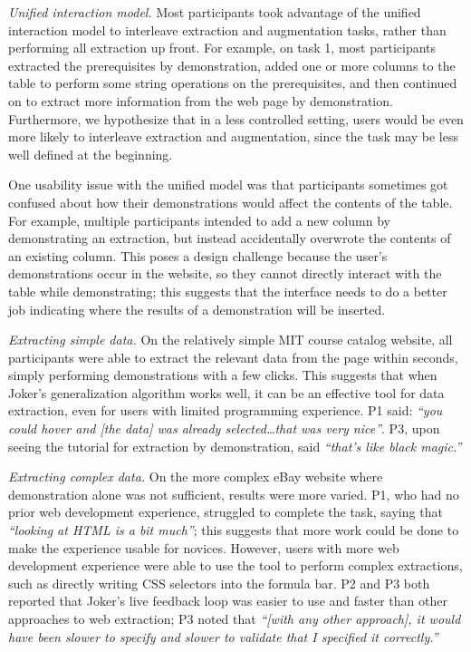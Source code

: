 \documentclass[conference]{IEEEtran}
\begin{document}
\emph{Unified interaction model.} Most participants took advantage of
the unified interaction model to interleave extraction and augmentation
tasks, rather than performing all extraction up front. For example, on
task 1, most participants extracted the prerequisites by demonstration,
added one or more columns to the table to perform some string operations
on the prerequisites, and then continued on to extract more information
from the web page by demonstration. Furthermore, we hypothesize that in
a less controlled setting, users would be even more likely to interleave
extraction and augmentation, since the task may be less well defined at
the beginning.

One usability issue with the unified model was that participants
sometimes got confused about how their demonstrations would affect the
contents of the table. For example, multiple participants intended to
add a new column by demonstrating an extraction, but instead
accidentally overwrote the contents of an existing column. This poses a
design challenge because the user's demonstrations occur in the website,
so they cannot directly interact with the table while demonstrating;
this suggests that the interface needs to do a better job indicating
where the results of a demonstration will be inserted.

\emph{Extracting simple data.} On the relatively simple MIT course
catalog website, all participants were able to extract the relevant data
from the page within seconds, simply performing demonstrations with a
few clicks. This suggests that when Joker's generalization algorithm
works well, it can be an effective tool for data extraction, even for
users with limited programming experience. P1 said: \emph{``you could
hover and {[}the data{]} was already selected\ldots that was very
nice''}. P3, upon seeing the tutorial for extraction by demonstration,
said \emph{``that's like black magic.''}

\emph{Extracting complex data.} On the more complex eBay website where
demonstration alone was not sufficient, results were more varied. P1,
who had no prior web development experience, struggled to complete the
task, saying that \emph{``looking at HTML is a bit much''}; this
suggests that more work could be done to make the experience usable for
novices. However, users with more web development experience were able
to use the tool to perform complex extractions, such as directly writing
CSS selectors into the formula bar. P2 and P3 both reported that Joker's
live feedback loop was easier to use and faster than other approaches to
web extraction; P3 noted that \emph{``{[}with any other approach{]}, it
would have been slower to specify and slower to validate that I
specified it correctly.''}
\end{document}

